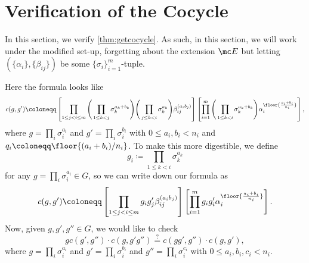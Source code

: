 \documentclass{article}
\numberwithin{equation}{section}
\begin{document}
\newpage
\appendix
\section{Verification of the Cocycle} \label{sec:verifycocycle}
In this section, we verify \autoref{thm:getcocycle}. As such, in this section, we will work under the modified set-up, forgetting about the extension $\mc E$ but letting $(\{\alpha_i\},\{\beta_{ij}\})$ be some $\{\sigma_i\}_{i=1}^m$-tuple.

Here the formula looks like
\[c(g,g')\coloneqq\left[\prod_{1\le j<i\le m}\Bigg(\prod_{1\le k<j}\sigma_k^{a_k+b_k}\Bigg)\Bigg(\prod_{j\le k<i}\sigma_k^{a_k}\Bigg)\beta_{ij}^{(a_ib_j)}\right]\left[\prod_{i=1}^m\Bigg(\prod_{1\le k<i}\sigma_k^{a_k+b_k}\Bigg)\alpha_i^{\floor{\frac{a_i+b_i}{n_i}}}\right],\]
where $g=\prod_i\sigma_i^{a_i}$ and $g'=\prod_i\sigma_i^{b_i}$ with $0\le a_i,b_i<n_i$ and $q_i\coloneqq\floor{(a_i+b_i)/n_i}$. To make this more digestible, we define
\[g_i\coloneqq\prod_{1\le k<i}\sigma_k^{a_k}\]
for any $g=\prod_i\sigma_i^{a_i}\in G$, so we can write down our formula as
\[c(g,g')\coloneqq\left[\prod_{1\le j<i\le m}g_ig'_j\beta_{ij}^{(a_ib_j)}\right]\left[\prod_{i=1}^mg_ig'_i\alpha_i^{\floor{\frac{a_i+b_i}{n_i}}}\right].\]
Now, given $g,g',g''\in G$, we would like to check
\[gc(g',g'')\cdot c(g,g'g'')\stackrel?=c(gg',g'')\cdot c(g,g'),\]
where $g=\prod_i\sigma_i^{a_i}$ and $g'=\prod_i\sigma_i^{b_i}$ and $g''=\prod_i\sigma_i^{c_i}$ with $0\le a_i,b_i,c_i<n_i$.
\end{document}
